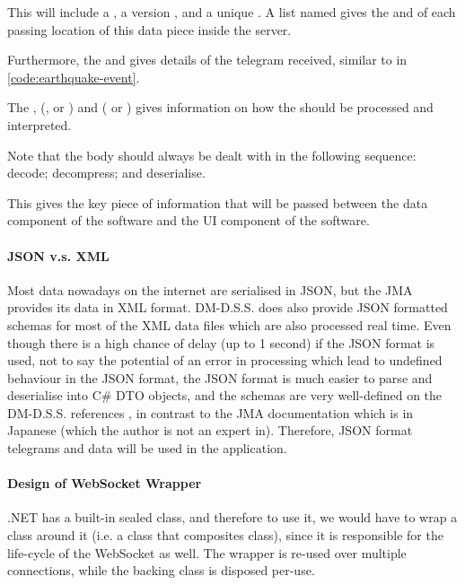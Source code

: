 \begin{itemize}
          This will include a , a version , and a unique . A list named  gives the  and  of each passing location of this data piece inside the server.

          Furthermore, the  and  gives details of the telegram received, similar to in \autoref{code:earthquake-event}.

          The ,  (,  or ) and  ( or ) gives information on how the  should be processed and interpreted.

          Note that the body should always be dealt with in the following sequence: decode; decompress; and deserialise.

          This gives the key piece of information that will be passed between the data component of the software and the UI component of the software.
\end{itemize}

\paragraph{JSON v.s. XML}

Most data nowadays on the internet are serialised in JSON, but the JMA provides its data in XML format. DM-D.S.S. does also provide JSON formatted schemas for most of the XML data files which are also processed real time. Even though there is a high chance of delay (up to 1 second) if the JSON format is used, not to say the potential of an error in processing which lead to undefined behaviour in the JSON format, the JSON format is much easier to parse and deserialise into C\# DTO objects, and the schemas are very well-defined on the DM-D.S.S. references \autocite{dmdata-references-json}, in contrast to the JMA documentation \autocite{jma-xml-format} which is in Japanese (which the author is not an expert in). Therefore, JSON format telegrams and data will be used in the application.

\paragraph{Design of WebSocket Wrapper}

.NET has a built-in sealed  class, and therefore to use it, we would have to wrap a class around it (i.e. a class that composites  class), since it is responsible for the life-cycle of the WebSocket as well. The wrapper is re-used over multiple connections, while the backing  class is disposed per-use.

